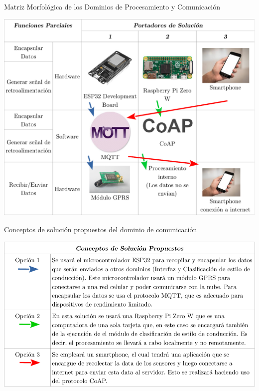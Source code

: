 \begin{table}[htbp!]
  \caption{Matriz Morfológica de los Dominios de Procesamiento y Comunicación}
  \label{diag:morf_com}
  \centering
  \includegraphics[width=\linewidth]{morf_com.pdf}
\end{table}

\begin{table}[htbp!]
  \caption{Conceptos de solución propuestos del dominio de comunicación}
  \label{diag:sol_com}
  \includegraphics[width=\linewidth]{sol_com.pdf}
\end{table}

